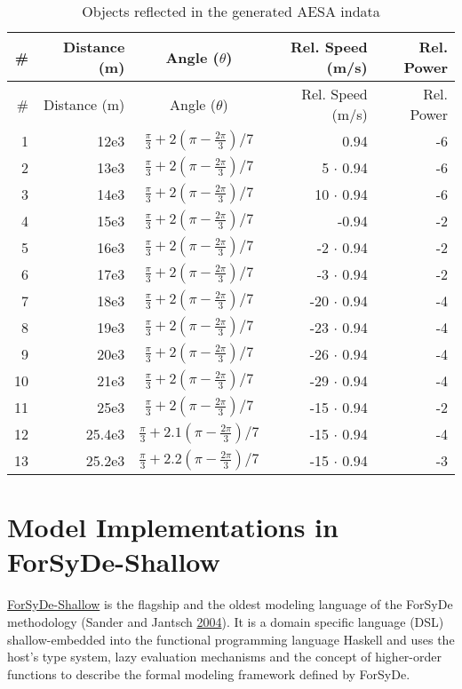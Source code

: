 \documentclass[
  a4paper,
]{article}
\begin{document}
\hypertarget{tbl:in-objects}{}
\begin{longtable}[]{@{}rrcrr@{}}
\caption{\label{tbl:in-objects}Objects reflected in the generated AESA
indata}\tabularnewline
\toprule
\# & Distance (m) & Angle (\(\theta\)) & Rel. Speed (m/s) & Rel.
Power\tabularnewline
\midrule
\endfirsthead
\toprule
\# & Distance (m) & Angle (\(\theta\)) & Rel. Speed (m/s) & Rel.
Power\tabularnewline
\midrule
\endhead
1 & 12e3 & \(\frac{\pi}{3} + 2(\pi-\frac{2\pi}{3})/7\) & 0.94 &
-6\tabularnewline
2 & 13e3 & \(\frac{\pi}{3} + 2(\pi-\frac{2\pi}{3})/7\) & 5 \(\cdot\)
0.94 & -6\tabularnewline
3 & 14e3 & \(\frac{\pi}{3} + 2(\pi-\frac{2\pi}{3})/7\) & 10 \(\cdot\)
0.94 & -6\tabularnewline
4 & 15e3 & \(\frac{\pi}{3} + 2(\pi-\frac{2\pi}{3})/7\) & -0.94 &
-2\tabularnewline
5 & 16e3 & \(\frac{\pi}{3} + 2(\pi-\frac{2\pi}{3})/7\) & -2 \(\cdot\)
0.94 & -2\tabularnewline
6 & 17e3 & \(\frac{\pi}{3} + 2(\pi-\frac{2\pi}{3})/7\) & -3 \(\cdot\)
0.94 & -2\tabularnewline
7 & 18e3 & \(\frac{\pi}{3} + 2(\pi-\frac{2\pi}{3})/7\) & -20 \(\cdot\)
0.94 & -4\tabularnewline
8 & 19e3 & \(\frac{\pi}{3} + 2(\pi-\frac{2\pi}{3})/7\) & -23 \(\cdot\)
0.94 & -4\tabularnewline
9 & 20e3 & \(\frac{\pi}{3} + 2(\pi-\frac{2\pi}{3})/7\) & -26 \(\cdot\)
0.94 & -4\tabularnewline
10 & 21e3 & \(\frac{\pi}{3} + 2(\pi-\frac{2\pi}{3})/7\) & -29 \(\cdot\)
0.94 & -4\tabularnewline
11 & 25e3 & \(\frac{\pi}{3} + 2(\pi-\frac{2\pi}{3})/7\) & -15 \(\cdot\)
0.94 & -2\tabularnewline
12 & 25.4e3 & \(\frac{\pi}{3} + 2.1(\pi-\frac{2\pi}{3})/7\) & -15
\(\cdot\) 0.94 & -4\tabularnewline
13 & 25.2e3 & \(\frac{\pi}{3} + 2.2(\pi-\frac{2\pi}{3})/7\) & -15
\(\cdot\) 0.94 & -3\tabularnewline
\bottomrule
\end{longtable}

\clearpage

\hypertarget{sec:shallow}{%
\section{Model Implementations in ForSyDe-Shallow}\label{sec:shallow}}

\href{https://forsyde.github.io/forsyde-shallow/}{ForSyDe-Shallow} is
the flagship and the oldest modeling language of the ForSyDe methodology
(Sander and Jantsch \protect\hyperlink{ref-sander-2004}{2004}). It is a
domain specific language (DSL) shallow-embedded into the functional
programming language Haskell and uses the host's type system, lazy
evaluation mechanisms and the concept of higher-order functions to
describe the formal modeling framework defined by ForSyDe.
\end{document}
